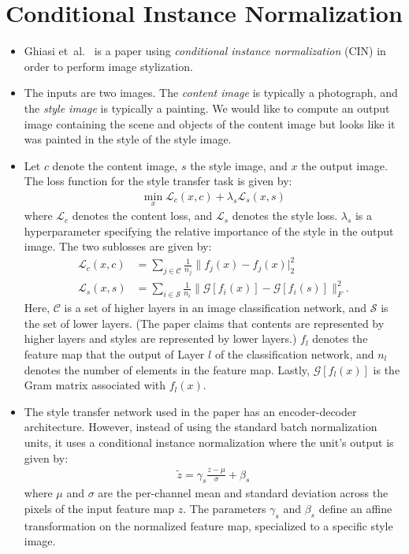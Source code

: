 \documentclass[10pt]{article}
\newcommand{\etal}{{et~al.}}
\begin{document}
  \section{Conditional Instance Normalization}

  \begin{itemize}
  	\item Ghiasi \etal~\cite{Ghiasi:2017} is a paper using \emph{conditional instance normalization} (CIN) in order to perform image stylization.

  	\item The inputs are two images. The \emph{content image} is typically a photograph, and the \emph{style image} is typically a painting. We would like to compute an output image containing the scene and objects of the content image but looks like it was painted in the style of the style image.

  	\item Let $c$ denote the content image, $s$ the style image, and $x$ the output image. The loss function for the style transfer task is given by:
  	\begin{align*}
  		\min_x \mathcal{L}_c (x,c) + \lambda_s \mathcal{L}_s (x,s)
  	\end{align*}
  	where $\mathcal{L}_c$ denotes the content loss, and $\mathcal{L}_s$ denotes the style loss. $\lambda_s$ is a hyperparameter specifying the relative importance of the style in the output image. The two sublosses are given by:
  	\begin{align*}
  		\mathcal{L}_c(x,c)
  		&= \sum_{j \in \mathcal{C}} \frac{1}{n_j} \| f_j(x) - f_j(x) |_2^2 \\
  		\mathcal{L}_s(x,s)
  		&= \sum_{i \in \mathcal{S}} \frac{1}{n_i} \| \mathcal{G}[f_i(x)] - \mathcal{G}[f_i(s)] \|_F^2.
  	\end{align*}
  	Here, $\mathcal{C}$ is a set of higher layers in an image classification network, and $\mathcal{S}$ is the set of lower layers. (The paper claims that contents are represented by higher layers and styles are represented by lower layers.) $f_l$ denotes the feature map that the output of Layer $l$ of the classification network, and $n_l$ denotes the number of elements in the feature map. Lastly, $\mathcal{G}[f_l(x)]$ is the Gram matrix associated with $f_l(x)$.

  	\item The style transfer network used in the paper has an encoder-decoder architecture. However, instead of using the standard batch normalization units, it uses a conditional instance normalization where the unit's output is given by:
  	\begin{align*}
  		\tilde{z} = \gamma_s \frac{z-\mu}{\sigma} + \beta_s
  	\end{align*}
  	where $\mu$ and $\sigma$ are the per-channel mean and standard deviation across the pixels of the input feature map $z$. The parameters $\gamma_s$ and $\beta_s$ define an affine transformation on the normalized feature map, specialized to a specific style image.


\end{itemize}
\end{document}
